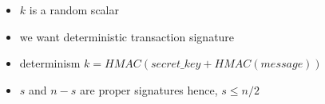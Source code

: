 \begin{itemize}
    \item $k$ is a random scalar
    \item we want deterministic transaction signature
    \item determinism $k = HMAC(secret\_key + HMAC(message))$
    \item $s$ and $n-s$ are proper signatures hence, $s \leq n/2$
\end{itemize}
